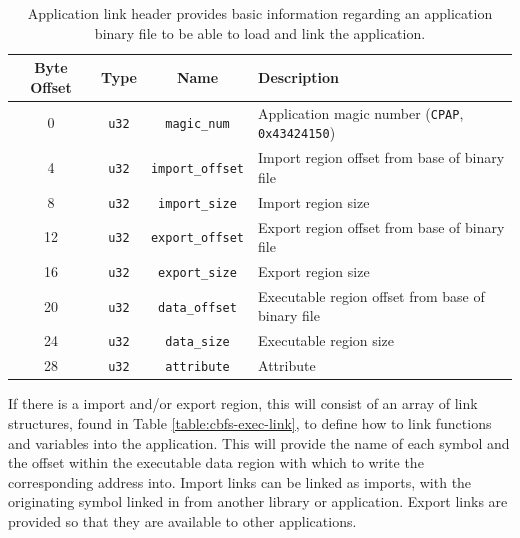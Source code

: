 \documentclass{article}
\begin{document}
\begin{table}[h!]
	\centering
	\begin{tabular}{c|cc|l}
		\hline
		Byte Offset & Type & Name & Description \\
		\hline
		0 & \texttt{u32} & \texttt{magic\_num} & Application magic number (\texttt{CPAP}, \texttt{0x43424150}) \\
		4 & \texttt{u32} & \texttt{import\_offset} & Import region offset from base of binary file \\
		8 & \texttt{u32} & \texttt{import\_size} & Import region size \\
		12 & \texttt{u32} & \texttt{export\_offset} & Export region offset from base of binary file \\
		16 & \texttt{u32} & \texttt{export\_size} & Export region size \\
		20 & \texttt{u32} & \texttt{data\_offset} & Executable region offset from base of binary file \\
		24 & \texttt{u32} & \texttt{data\_size} & Executable region size \\
		28 & \texttt{u32} & \texttt{attribute} & Attribute \\
		\hline
	\end{tabular}
	\caption{Application link header provides basic information regarding an application binary file to be able to load and link the application.}
	\label{table:cbos-exec-header}
\end{table}

If there is a import and/or export region, this will consist of an array of link structures, found in Table \ref{table:cbfs-exec-link}, to define how to link functions and variables into the application. This will provide the name of each symbol and the offset within the executable data region with which to write the corresponding address into. Import links can be linked as imports, with the originating symbol linked in from another library or application. Export links are provided so that they are available to other applications.
\end{document}
